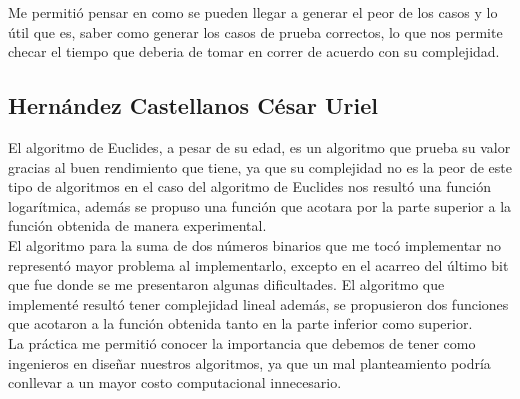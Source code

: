 \documentclass[12pt,twoside]{article}
\begin{document}
Me permitió pensar en como se pueden llegar a generar el peor de los casos y lo útil que es, saber como generar los casos de prueba correctos, lo que nos permite checar el tiempo que deberia de tomar en correr de acuerdo con su complejidad.

\subsection*{Hernández Castellanos César Uriel}
El algoritmo de Euclides, a pesar de su edad, es un algoritmo que prueba su
valor gracias al buen rendimiento que tiene, ya que su complejidad no es la peor de este tipo de algoritmos en el caso del algoritmo de Euclides nos resultó una función logarítmica, además se propuso una función que acotara por la parte superior a la función obtenida de manera experimental.\\

El algoritmo para la suma de dos números binarios que me tocó implementar no representó mayor problema al implementarlo, excepto en el acarreo del último bit que fue donde se me presentaron algunas dificultades. El algoritmo que implementé resultó tener complejidad lineal además, se propusieron dos funciones que acotaron a la función obtenida tanto en la parte inferior como superior.\\

La práctica me permitió conocer la importancia que debemos de tener como ingenieros en diseñar nuestros algoritmos, ya que un mal planteamiento podría conllevar a un mayor costo computacional innecesario.
\vspace{200 mm}
\end{document}
